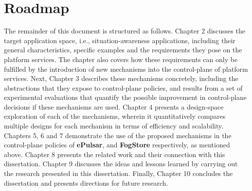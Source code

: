 \section{Roadmap}
The remainder of this document is structured as follows. Chapter 2 discusses the target application space, i.e., situation-awareness applications, including their general characteristics, specific examples and the requirements they pose on the platform services. The chapter also covers how these requirements can only be fulfilled by the introduction of new mechanisms into the control-plane of platform services. Next, Chapter 3 describes these mechanisms concretely, including the abstractions that they expose to control-plane policies, and results from a set of experimental evaluations that quantify the possible improvement in control-plane decisions if these mechanisms are used. Chapter 4 presents a design-space exploration of each of the mechanisms, wherein it quantitatively compares multiple designs for each mechanism in terms of efficiency and scalability. Chapters 5, 6 and 7 demonstrate the use of the proposed mechanisms in the control-plane policies of \textbf{ePulsar}, \oneedge{} and \textbf{FogStore} respectively, as mentioned above. Chapter 8 presents the related work and their connection with this dissertation. Chapter 9 discusses the ideas and lessons learned by carrying out the research presented in this dissertation. Finally, Chapter 10 concludes the dissertation and presents directions for future research.